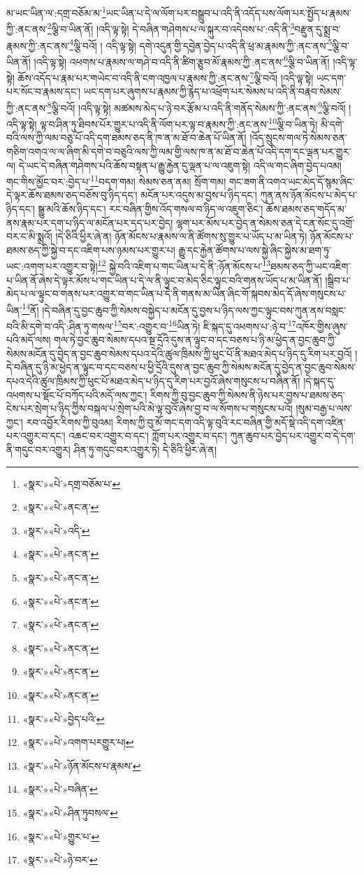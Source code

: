 མ་ཡང་ཡིན་ལ་:དགྲ་བཅོམ་མ་\footnote{«སྣར་»«པེ་»དགྲ་བཅོམ་པ་}ཡང་ཡིན་པ་དེ་ལ་ལོག་པར་བསྒྲུབ་པ་འདི་ནི་འདོད་པས་ལོག་པར་སྤྱོད་པ་རྣམས་ཀྱི་:ནང་ནས་\footnote{«སྣར་»«པེ་»ནང་ན་}ལྕི་བ་ཡིན་ནོ། །འདི་ལྟ་སྟེ། དེ་བཞིན་གཤེགས་པ་ལ་སྐུར་བ་འདེབས་པ་:འདི་ནི་\footnote{«སྣར་»«པེ་»འདི་}བརྫུན་དུ་སྨྲ་བ་རྣམས་ཀྱི་:ནང་ནས་\footnote{«སྣར་»«པེ་»ནང་ན་}ལྕི་བའོ། །
འདི་ལྟ་སྟེ། དགེ་འདུན་གྱི་དབྱེན་བྱེད་པ་འདི་ནི་ཕྲ་མ་རྣམས་ཀྱི་:ནང་ནས་\footnote{«སྣར་»«པེ་»ནང་ན་}ལྕི་བ་ཡིན་ནོ། །འདི་ལྟ་སྟེ། འཕགས་པ་རྣམས་ལ་གཤེ་བ་འདི་ནི་ཚིག་རྩུབ་མོ་རྣམས་ཀྱི་:ནང་ནས་\footnote{«སྣར་»«པེ་»ནང་ན་}ལྕི་བ་ཡིན་ནོ། །འདི་ལྟ་སྟེ། ཆོས་འདོད་པ་རྣམ་པར་གཡེང་བ་འདི་ནི་ངག་འཁྱལ་པ་རྣམས་ཀྱི་:ནང་ནས་\footnote{«སྣར་»«པེ་»ནང་ན་}ལྕི་བའོ། །འདི་ལྟ་སྟེ། ཡང་དག་པར་སོང་བ་རྣམས་དང་། ཡང་དག་པར་ཞུགས་པ་རྣམས་ཀྱི་རྙེད་པ་འཕྲོག་པར་སེམས་པ་འདི་ནི་བརྣབ་སེམས་ཀྱི་:ནང་ནས་\footnote{«སྣར་»«པེ་»ནང་ན་}ལྕི་བའོ། །འདི་ལྟ་སྟེ། མཚམས་མེད་པ་ཉེ་བར་རྩོམ་པ་འདི་ནི་གནོད་སེམས་ཀྱི་:ནང་ནས་\footnote{«སྣར་»«པེ་»ནང་ན་}ལྕི་བའོ། །འདི་ལྟ་སྟེ། ལྟ་བ་ཤིན་ཏུ་ཐིབས་པོར་གྱུར་པ་འདི་ནི་ལོག་པར་ལྟ་བ་རྣམས་ཀྱི་:ནང་ནས་\footnote{«སྣར་»«པེ་»ནང་ན་}ལྕི་བ་ཡིན་ཏེ། མི་དགེ་བའི་ལས་ཀྱི་ལམ་བཅུ་པོ་འདི་དག་ཐམས་ཅད་ནི་ཁ་ན་མ་ཐོ་བ་ཆེན་པོ་ཡིན་ནོ། །འོད་སྲུངས་གལ་ཏེ་སེམས་ཅན་གཅིག་འགའ་ལ་ལ་ཞིག་མི་དགེ་བ་བཅུའི་ལས་ཀྱི་ལམ་གྱི་ལས་ཁ་ན་མ་ཐོ་བ་ཆེན་པོ་འདི་དག་དང་ལྡན་པར་གྱུར་ལ། དེ་ཡང་དེ་བཞིན་གཤེགས་པའི་ཆོས་བསྟན་པ་རྒྱུ་རྐྱེན་དུ་ལྡན་པ་ལ་འཇུག་སྟེ། འདི་ལ་གང་ཞིག་བྱེད་པའམ། གང་གིས་མྱོང་བར་:བྱེད་པ་\footnote{«སྣར་»«པེ་»བྱེད་པའི་}བདག་གམ། སེམས་ཅན་ནམ། སྲོག་གམ། གང་ཟག་ནི་འགའ་ཡང་མེད་དོ་སྙམ་ཞིང་དེ་ལྟར་ཆོས་ཐམས་ཅད་བཅོས་བུ་ཉིད་དང་། མངོན་པར་འདུས་མ་བྱས་པ་ཉིད་དང་། ཀུན་ནས་ཉོན་མོངས་པ་མེད་པ་ཉིད་དང་། སྒྱུ་མའི་ཆོས་ཉིད་དང་། རང་བཞིན་གྱིས་འོད་གསལ་བ་ཉིད་ལ་འཇུག་ཅིང་། ཆོས་ཐམས་ཅད་གདོད་མ་ནས་རྣམ་པར་དག་པ་ཉིད་ལ་མངོན་པར་དད་པར་བྱེད། ལྷག་པར་མོས་པར་བྱེད་ན་སེམས་ཅན་དེ་ངན་སོང་དུ་འགྲོ་བར་ང་མི་སྨྲའོ། །དེ་ཅིའི་ཕྱིར་ཞེ་ན། ཉོན་མོངས་པ་རྣམས་ལ་ནི་ཚོགས་སུ་གྱུར་པ་ཡོད་པ་མ་ཡིན་ཏེ། ཉོན་མོངས་པ་ཐམས་ཅད་ཀྱི་སྐྱེ་བ་དང་འཇིག་པས་ཉམས་པར་གྱུར་པ། རྒྱུ་དང་རྐྱེན་ཚོགས་པ་ལས་སྐྱེ་ཞིང་སྐྱེས་མ་ཐག་ཏུ་ཡང་:འགག་པར་འགྱུར་བ་སྟེ།\footnote{«སྣར་»«པེ་»འགག་པརགྱུར་པ།} སྐྱེ་བའི་འཇིག་པ་གང་ཡིན་པ་དེ་ནི་:ཉོན་མོངས་པ་\footnote{«སྣར་»«པེ་»ཉོན་མོངས་པ་རྣམས་}ཐམས་ཅད་ཀྱི་ཡང་འཇིག་པ་ཡིན་ནོ་ཞེས་དེ་ལྟར་མོས་པ་གང་ཡིན་པ་དེ་ལ་ནི་ལྟུང་བ་མེད་ཅིང་ལྟུང་བའི་གནས་ཡོད་པ་མ་ཡིན་ནོ། །སྒྲིབ་པ་མེད་པ་ལ་ལྟུང་བ་གནས་པར་འགྱུར་བ་གང་ཡིན་པ་དེ་ནི་གནས་མ་ཡིན་ཞིང་གོ་སྐབས་མེད་དོ་ཞེས་གསུངས་པ་ཡིན་\footnote{«སྣར་»«པེ་»བཞིན་}ནོ། །དེ་བཞིན་དུ་བྱང་ཆུབ་ཀྱི་སེམས་བསྐྱེད་པ་མངོན་དུ་བྱས་པ་ཉིད་ལས་ཀྱང་ལྟུང་བས་ཀུན་ནས་བསླང་བའི་མི་དགེ་བ་འདི་:ཤིན་ཏུ་གསལ་\footnote{«སྣར་»«པེ་»ཤིན་ཏུབསལ་}བར་:འགྱུར་བ་\footnote{«སྣར་»«པེ་»གྱུར་པ་}ཡིན་ཏེ། ཇི་སྐད་དུ་འཕགས་པ་:ཉེ་བ་\footnote{«སྣར་»«པེ་»ཉེ་བར་}འཁོར་གྱིས་ཞུས་པའི་མདོ་ལས། གལ་ཏེ་བྱང་ཆུབ་སེམས་དཔའ་སྔ་དྲོའི་དུས་ན་ལྟུང་བ་དང་བཅས་པ་ཉི་མ་ཕྱེད་ན་བྱང་ཆུབ་ཀྱི་སེམས་མངོན་དུ་བྱེད་ན་བྱང་ཆུབ་སེམས་དཔའ་དེའི་ཚུལ་ཁྲིམས་ཀྱི་ཕུང་པོ་ནི་མཐའ་མེད་པ་ཉིད་དུ་རིག་པར་བྱའོ། །དེ་བཞིན་དུ་ཉི་མ་ཕྱེད་ན་ལྟུང་བ་དང་བཅས་པ་ཕྱི་དྲོའི་དུས་ན་བྱང་ཆུབ་ཀྱི་སེམས་མངོན་དུ་བྱེད་ན་བྱང་ཆུབ་སེམས་དཔའ་དེའི་ཚུལ་ཁྲིམས་ཀྱི་ཕུང་པོ་མཐའ་མེད་པ་ཉིད་དུ་རིག་པར་བྱའོ་ཞེས་གསུངས་པ་བཞིན་ནོ། །དེ་སྐད་དུ་འཕགས་པ་སྡོང་པོ་བཀོད་པའི་མདོ་ལས་ཀྱང་། རིགས་ཀྱི་བུ་བྱང་ཆུབ་ཀྱི་སེམས་ནི་ཉེས་པར་བྱས་པ་ཐམས་ཅད་ངེས་པར་སྲེག་པ་ཉིད་ཀྱིས་བསྐལ་པ་སྲེག་པའི་མེ་ལྟ་བུའོ་ཞེས་བྱ་བ་ལ་སོགས་པ་གསུངས་པའོ། །སུམ་བརྒྱ་པ་ལས་ཀྱང་། རབ་འབྱོར་རིགས་ཀྱི་བུའམ། རིགས་ཀྱི་བུ་མོ་གང་དག་འདི་ལྟ་བུའི་རང་བཞིན་གྱི་མདོ་སྡེ་འདི་དག་འཛིན་པར་འགྱུར་བ་དང་། འཆང་བར་འགྱུར་བ་དང་། ཀློག་པར་འགྱུར་བ་དང་། ཀུན་ཆུབ་པར་བྱེད་པར་འགྱུར་བ་དེ་དག་ནི་གདུང་བར་འགྱུར། ཤིན་ཏུ་གདུང་བར་འགྱུར་ཏེ། དེ་ཅིའི་ཕྱིར་ཞེ་ན། 